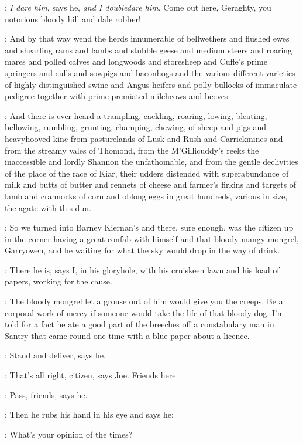 \Nq:
\emph{I dare him}, says he, \emph{and I doubledare him}.
Come out here, Geraghty,
you notorious bloody hill and dale robber!

:
And by that way wend the herds innumerable of bellwethers and
flushed ewes and shearling rams and lambs and stubble geese and medium
steers and roaring mares and polled calves and longwoods and storesheep
and Cuffe's prime springers and culls and sowpigs and baconhogs and the
various different varieties of highly distinguished swine and Angus
heifers and polly bullocks of immaculate pedigree together with prime
premiated milchcows and beeves\sout{:}

:
And there is ever heard a trampling,
cackling, roaring, lowing, bleating, bellowing, rumbling, grunting,
champing, chewing,
of sheep and pigs and heavyhooved kine from
pasturelands of Lusk and Rush and Carrickmines and from the streamy vales
of Thomond, from the M'Gillicuddy's reeks the inaccessible and lordly
Shannon the unfathomable, and from the gentle declivities of the place of
the race of Kiar, their udders distended with superabundance of milk and
butts of butter and rennets of cheese and farmer's firkins and targets of
lamb and crannocks of corn and oblong eggs in great hundreds, various in
size, the agate with this dun.

\Nq:
So we turned into Barney Kiernan's and there, sure enough, was the citizen
up in the corner having a great confab with himself and that bloody
mangy mongrel, Garryowen,
and he waiting for what the sky would drop
in the way of drink.

:
There he is, \sout{says I,}
in his gloryhole, with his cruiskeen lawn and his
load of papers, working for the cause.

\Nq:
The bloody mongrel let a grouse out of him would give you the creeps.  Be
a corporal work of mercy if someone would take the life of that
bloody dog. I'm told for a fact he ate a good part of the breeches off a
constabulary man in Santry that came round one time with a blue paper
about a licence.

\citizen:
Stand and deliver, \sout{says he}.

\joe:
That's all right, citizen, \sout{says Joe}.
Friends here.

\citizen:
Pass, friends, \sout{says he}.

\Nq:
Then he rubs his hand in his eye and says he:

\citizen:
What's your opinion of the times?

